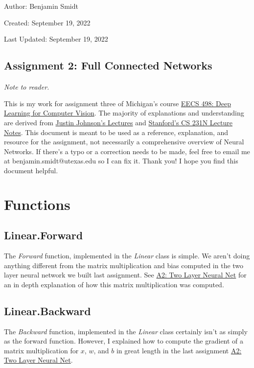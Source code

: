\documentclass[12pt]{article}
\begin{document}
\noindent Author: Benjamin Smidt

\noindent Created: September 19, 2022

\noindent Last Updated: September 19, 2022
\begin{center}
\section*{Assignment 2: Full Connected Networks}
\end{center}

\paragraph{} \emph{Note to reader.} 

This is my work for assignment three of Michigan's course
\href{https://web.eecs.umich.edu/~justincj/teaching/eecs498/WI2022/}
{EECS 498: Deep Learning for Computer Vision}. The majority of explanations and understanding are 
derived from \href{https://www.youtube.com/watch?v=dJYGatp4SvA&list=PL5-TkQAfAZFbzxjBHtzdVCWE0Zbhomg7r&index=1}
{Justin Johnson's Lectures} and \href{http://cs231n.stanford.edu/schedule.html}{Stanford's CS 231N Lecture Notes}.
This document is meant to be used as a reference, 
explanation, and resource for the assignment, not necessarily a comprehensive overview
of Neural Networks. If there's a typo or a correction needs to be made, feel free to 
email me at benjamin.smidt@utexas.edu so I can fix it. Thank you! I hope you find this 
document helpful.

\tableofcontents{}

\section{Functions}

\subsection{Linear.Forward}
The \emph{Forward} function, implemented in the \emph{Linear} class is simple. We aren't doing 
anything different from the matrix multiplication and bias computed in the two layer
neural network we built last assignment. See \href{https://github.com/bensmidt/EECS-498-DL-Computer-Vision/blob/main/A2/A2-Two-Layer-NN.pdf}
{A2: Two Layer Neural Net} for an in depth explanation of how this matrix multiplication was 
computed. 

\subsection{Linear.Backward}
The \emph{Backward} function, implemented in the \emph{Linear} class certainly isn't
as simply as the forward function. However, I explained how to compute the gradient of 
a matrix multiplication for $x$, $w$, and $b$ in great length in the last assignment 
\href{https://github.com/bensmidt/EECS-498-DL-Computer-Vision/blob/main/A2/A2-Two-Layer-NN.pdf}
{A2: Two Layer Neural Net}.
\end{document}
